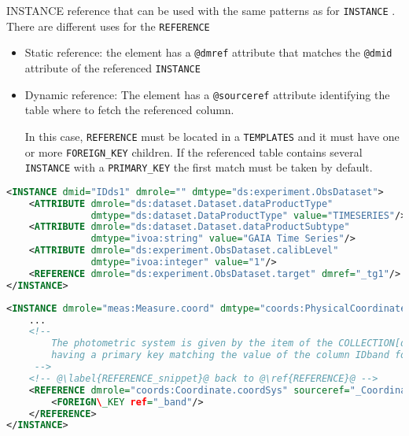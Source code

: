 INSTANCE reference that can be used with the same patterns as for \texttt{INSTANCE} .
There are different uses for the \texttt{REFERENCE} 

\begin{itemize}
    \item Static reference: the element has a \texttt{@dmref} attribute that matches the \texttt{@dmid} attribute of the referenced \texttt{INSTANCE} 
    \item Dynamic reference: The element has a \texttt{@sourceref} attribute identifying  the table where to fetch the referenced column. 
    
             In this case, \texttt{REFERENCE} must be located in a \texttt{TEMPLATES} and it must have one or more \texttt{FOREIGN\_KEY} children. 
             If the referenced table contains several \texttt{INSTANCE} with a \texttt{PRIMARY\_KEY}  the first match must be taken by default.
\end{itemize}

\begin{lstlisting}[caption={Simple \texttt{REFERENCE}, to be replaced with the \texttt{INSTANCE} having \texttt{@dmid=\_tg1} (see \ref{REFERENCE_snippet_1}).},language=XML]
<INSTANCE dmid="IDds1" dmrole="" dmtype="ds:experiment.ObsDataset">
    <ATTRIBUTE dmrole="ds:dataset.Dataset.dataProductType" 
               dmtype="ds:dataset.DataProductType" value="TIMESERIES"/>
    <ATTRIBUTE dmrole="ds:dataset.Dataset.dataProductSubtype" 
               dmtype="ivoa:string" value="GAIA Time Series"/>
    <ATTRIBUTE dmrole="ds:experiment.ObsDataset.calibLevel" 
               dmtype="ivoa:integer" value="1"/>
    <REFERENCE dmrole="ds:experiment.ObsDataset.target" dmref="_tg1"/>
</INSTANCE>

\end{lstlisting}

\begin{lstlisting}[caption={Dynamic \texttt{REFERENCE}, to be replaced with the \texttt{INSTANCE} of the table of collection \texttt{\_CoordinateSystems} and having a \texttt{PRIMARY\_KEY} matching the value of the column  \texttt{\_band}. This pattern is valid in the context of a TEMPLATES (see \ref{REFERENCE_snippet_2}).},language=XML]
<INSTANCE dmrole="meas:Measure.coord" dmtype="coords:PhysicalCoordinate">
    ...
    <!--
        The photometric system is given by the item of the COLLECTION[dmid=IDCoordinateSystems]
        having a primary key matching the value of the column IDband for that particular row
     -->
    <!-- @\label{REFERENCE_snippet}@ back to @\ref{REFERENCE}@ -->
    <REFERENCE dmrole="coords:Coordinate.coordSys" sourceref="_CoordinateSystems">
        <FOREIGN\_KEY ref="_band"/>
    </REFERENCE>
</INSTANCE>
\end{lstlisting}

